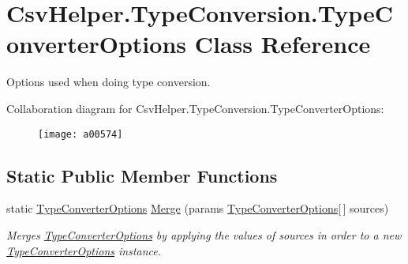 \hypertarget{a00178}{\section{Csv\-Helper.\-Type\-Conversion.\-Type\-Converter\-Options Class Reference}
\label{a00178}
}


Options used when doing type conversion.  




Collaboration diagram for Csv\-Helper.\-Type\-Conversion.\-Type\-Converter\-Options\-:
\nopagebreak
\begin{figure}[H]
\begin{center}
\leavevmode
\texttt{[image: a00574]}
\end{center}
\end{figure}
\subsection*{Static Public Member Functions}
\begin{DoxyCompactItemize}
\item 
static \hyperlink{a00178}{Type\-Converter\-Options} \hyperlink{a00178_a0532694cffc600fe984e10c7f1375e0a}{Merge} (params \hyperlink{a00178}{Type\-Converter\-Options}\mbox{[}$\,$\mbox{]} sources)
\begin{DoxyCompactList}\small\item\em Merges \hyperlink{a00178}{Type\-Converter\-Options} by applying the values of sources in order to a new \hyperlink{a00178}{Type\-Converter\-Options} instance. \end{DoxyCompactList}\end{DoxyCompactItemize}
